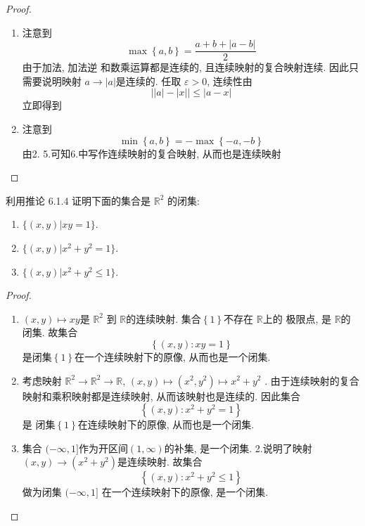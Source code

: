 \documentclass[../main.tex]{subfiles}
\begin{document}
\begin{proof}
\begin{enumerate}
\[    \]从而 \(  x^{-1} \in B_{d}\left( a^{-1} ,  \varepsilon  \right)   \), 这表明映射连续.
    \item 注意到 \[
    \max \left\{ a,b \right\}= \frac{a+ b+ \left| a-b \right|  }{2 } 
    \]由于加法, 加法逆 和数乘运算都是连续的, 且连续映射的复合映射连续. 因此只需要说明映射 \(  a\to \left| a \right|   \)是连续的. 任取 \(   \varepsilon > 0  \), 连续性由 \[
    \left| \left| a \right|-\left| x \right|   \right|\le \left| a-x \right|  
    \]立即得到 
    \item 注意到 \[
    \min \left\{ a,b \right\}= -\max \left\{ -a,-b \right\}
    \]由2. 5.可知6.中写作连续映射的复合映射, 从而也是连续映射 
  \end{enumerate}
  
   
\end{proof}

\begin{exercise}{}{}
利用推论 6.1.4 证明下面的集合是 $\mathbb{R}^2$ 的闭集:
\begin{enumerate}
\item $\{(x, y) | xy = 1\}$.
\item $\{(x, y) | x^2 + y^2 = 1\}$.
\item $\{(x, y) | x^2 + y^2 \le 1\}$.
\end{enumerate}
\end{exercise}

\begin{proof}
  \begin{enumerate}
    \item \(  \left( x,y \right)\mapsto xy   \)是 \(  \mathbb{R} ^{2}  \)  到 \(  \mathbb{R}   \)的连续映射. 集合\(  \left\{ 1 \right\}  \)不存在 \(  \mathbb{R}   \)上的 极限点, 是 \(  \mathbb{R}   \)的闭集.   故集合 \[
    \left\{ \left( x,y \right):xy= 1  \right\}
    \]是闭集\(  \left\{ 1 \right\}  \)在一个连续映射下的原像, 从而也是一个闭集.
    \item 考虑映射 \(  \mathbb{R} ^{2}\to \mathbb{R} ^{2}\to \mathbb{R}   \),  \(  \left( x,y \right)\mapsto   \left( x^{2},y^{2} \right)\mapsto x^{2}+ y^{2}  \)  . 由于连续映射的复合映射和乘积映射都是连续映射, 从而该映射也是连续的. 因此集合\[
    \left\{ \left( x,y \right):x^{2}+ y^{2}= 1  \right\}
    \]是 闭集\(  \left\{ 1 \right\}  \)在连续映射下的原像, 从而也是一个闭集. 
    \item  集合 \(  (-\infty,1]  \)作为开区间\(  (1,\infty)  \)的补集, 是一个闭集. 2.说明了映射 \(  \left( x,y \right)\to \left( x^{2}+ y^{2} \right)    \)是连续映射.  故集合 \[
    \left\{ \left( x,y \right):x^{2}+ y^{2}\le 1  \right\}
    \] 做为闭集 \(  (-\infty,1]  \) 在一个连续映射下的原像, 是一个闭集.
  \end{enumerate}
  
\end{proof}
\end{document}
